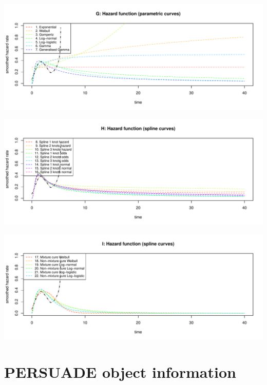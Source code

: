 \documentclass[]{article}
\begin{document}
\begin{flushleft}\includegraphics[height=0.29\textheight]{Images/validate_extrapolation3-7} \end{flushleft}

\begin{flushleft}\includegraphics[height=0.29\textheight]{Images/validate_extrapolation3-8} \end{flushleft}

\begin{flushleft}\includegraphics[height=0.29\textheight]{Images/validate_extrapolation3-9} \end{flushleft}

\newpage

\section{PERSUADE object information}\label{persuade-object-information}
\end{document}
